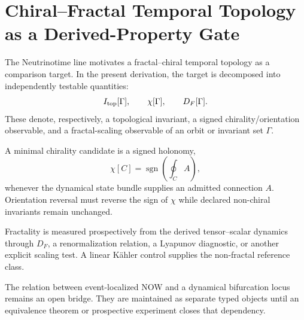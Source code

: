 \chapter[Chiral--Fractal Temporal Topology]{Chiral--Fractal Temporal Topology as a Derived-Property Gate}
The Neutrinotime line motivates a fractal--chiral temporal topology as a comparison target. In the present derivation, the target is decomposed into independently testable quantities:
\[
I_{\rm top}[\Gamma],\qquad \chi[\Gamma],\qquad D_F[\Gamma].
\]
These denote, respectively, a topological invariant, a signed chirality/orientation observable, and a fractal-scaling observable of an orbit or invariant set \(\Gamma\).

A minimal chirality candidate is a signed holonomy,
\[
\chi[C]=\operatorname{sgn}\!\left(\oint_C A\right),
\]
whenever the dynamical state bundle supplies an admitted connection \(A\). Orientation reversal must reverse the sign of \(\chi\) while declared non-chiral invariants remain unchanged.

Fractality is measured prospectively from the derived tensor--scalar dynamics through \(D_F\), a renormalization relation, a Lyapunov diagnostic, or another explicit scaling test. A linear Kähler control supplies the non-fractal reference class.

The relation between event-localized NOW and a dynamical bifurcation locus remains an open bridge. They are maintained as separate typed objects until an equivalence theorem or prospective experiment closes that dependency.

